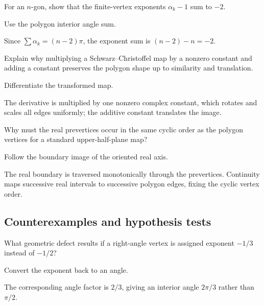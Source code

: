 \begin{exercise}\label{exr:iv18-expand-07}
For an \(n\)-gon, show that the finite-vertex exponents \(\alpha_k-1\) sum to \(-2\).
\end{exercise}
\begin{hint}
Use the polygon interior angle sum.
\end{hint}
\begin{solution}
Since \(\sum\alpha_k=(n-2)\pi\), the exponent sum is \((n-2)-n=-2\).
\end{solution}

\begin{exercise}\label{exr:iv18-expand-08}
Explain why multiplying a Schwarz--Christoffel map by a nonzero constant and adding a constant preserves the polygon shape up to similarity and translation.
\end{exercise}
\begin{hint}
Differentiate the transformed map.
\end{hint}
\begin{solution}
The derivative is multiplied by one nonzero complex constant, which rotates and scales all edges uniformly; the additive constant translates the image.
\end{solution}

\begin{exercise}\label{exr:iv18-expand-09}
Why must the real prevertices occur in the same cyclic order as the polygon vertices for a standard upper-half-plane map?
\end{exercise}
\begin{hint}
Follow the boundary image of the oriented real axis.
\end{hint}
\begin{solution}
The real boundary is traversed monotonically through the prevertices. Continuity maps successive real intervals to successive polygon edges, fixing the cyclic vertex order.
\end{solution}

\subsection*{Counterexamples and hypothesis tests}

\begin{exercise}\label{exr:iv18-expand-10}
What geometric defect results if a right-angle vertex is assigned exponent \(-1/3\) instead of \(-1/2\)?
\end{exercise}
\begin{hint}
Convert the exponent back to an angle.
\end{hint}
\begin{solution}
The corresponding angle factor is \(2/3\), giving an interior angle \(2\pi/3\) rather than \(\pi/2\).
\end{solution}

